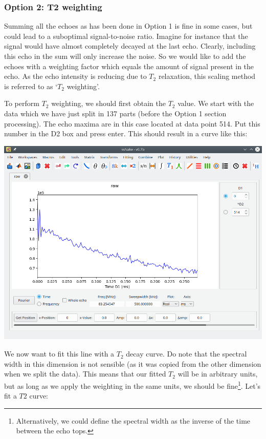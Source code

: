 \documentclass[11pt,a4paper]{article}
\begin{document}
\subsubsection{Option 2: T2 weighting}
Summing all the echoes as has been done in Option 1 is fine in some cases, but could lead to a suboptimal signal-to-noise ratio.
Imagine for instance that the signal would have almost completely decayed at the last echo. 
Clearly, including this echo in the sum will only increase the noise.
So we would like to add the echoes with a weighting factor which equals the amount of signal present in the echo.
As the echo intensity is reducing due to $T_2$ relaxation, this scaling method is referred to as `$T_2$ weighting'.

To perform $T_2$  weighting, we should first obtain the $T_2$ value.
We start with the data which we have just split in 137 parts (before the Option 1 section processing).
The echo maxima are in this case located at data point 514.
Put this number in the D2 box and press enter.
This should result in a curve like this:
\begin{center}
\includegraphics[width=0.7\linewidth]{Figs/Fig7.png}
\end{center}

We now want to fit this line with a $T_2$ decay curve.
Do note that the spectral width in this dimension is not sensible (as it was copied from the other dimension when we split the data).
This means that our fitted $T_2$ will be in arbitrary units, but as long as we apply the weighting in the same units, we should be fine\footnote{Alternatively, we could define the spectral width as the inverse of the time between the echo tops.}.
Let's fit a $T2$ curve:
\end{document}
